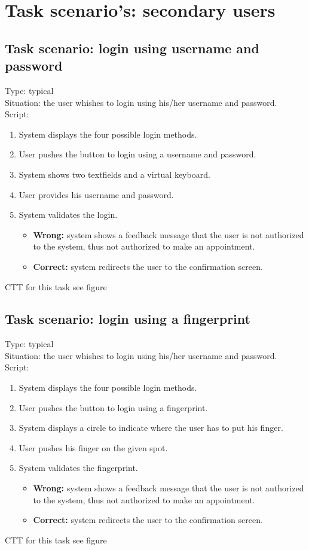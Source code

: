 \documentclass[11pt, a4paper,svglistings]{report}
\begin{document}
\section{Task scenario's: secondary users}

\subsection{Task scenario: login using username and password}

Type: typical \\
Situation: the user whishes to login using his/her username and password. \\
Script:
\begin{enumerate}
\item System displays the four possible login methods.
\item User pushes the button to login using a username and password.
\item System shows two textfields and a virtual keyboard.
\item User provides his username and password.
\item System validates the login.
\begin{itemize}
\item \textbf{Wrong:} system shows a feedback message that the user is not authorized to the system, thus not authorized to make an appointment.
\item \textbf{Correct:} system redirects the user to the  confirmation screen.
\end{itemize}
\end{enumerate}
CTT for this task see figure %

\subsection{Task scenario: login using a fingerprint}

Type: typical \\
Situation: the user whishes to login using his/her username and password. \\
Script:
\begin{enumerate}
\item System displays the four possible login methods.
\item User pushes the button to login using a fingerprint.
\item System displays a circle to indicate where the user has to put his finger.
\item User pushes his finger on the given spot.
\item System validates the fingerprint.
\begin{itemize}
\item \textbf{Wrong:} system shows a feedback message that the user is not authorized to the system, thus not authorized to make an appointment.
\item \textbf{Correct:} system redirects the user to the  confirmation screen.
\end{itemize}
\end{enumerate}
CTT for this task see figure %
\end{document}
